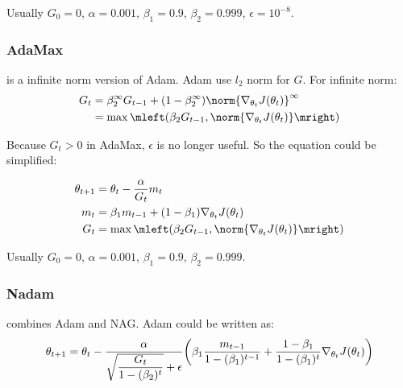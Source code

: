 Usually $G_0 = 0$, $\alpha = 0.001$, $\beta_1 = 0.9$, $\beta_2 = 0.999$, $\epsilon = 10^{-8}$.





\subsubsection{AdaMax}
\cite{Kingma2015} is a infinite norm version of Adam. Adam use $l_2$ norm for $G$. For infinite norm:
\begin{equation}
    \begin{aligned}
        G_t &= \beta_2^\infty G_{t-1} + (1-\beta_2^\infty ) \norm{\nabla_{\theta_t} J(\theta_t)}^\infty  \\
        &= \max \mleft(\beta_2 G_{t-1}, \norm{\nabla_{\theta_t} J(\theta_t)} \mright)
    \end{aligned}
\end{equation}

Because $G_t > 0$ in AdaMax, $\epsilon$ is no longer useful. So the equation could be simplified:

\begin{equation}
    \begin{aligned}
        \theta_{t+1} &= \theta_t - \frac{\alpha}{G_t}  m_t \\
        m_t &= \beta_1 m_{t-1} + (1-\beta_1) \nabla_{\theta_t} J(\theta_t) \\
        G_t &= \max \mleft(\beta_2 G_{t-1}, \norm{\nabla_{\theta_t} J(\theta_t)} \mright)
    \end{aligned}
\end{equation}

Usually $G_0 = 0$, $\alpha = 0.001$, $\beta_1 = 0.9$, $\beta_2 = 0.999$.


\subsubsection{Nadam}

\cite{Dozat2016} combines Adam and NAG. Adam could be written as:
\begin{equation}
    \theta_{t+1} = \theta_t - \frac{\alpha}{\sqrt{\displaystyle \frac{G_t}{1-(\beta_2)^t}} + \epsilon} \mleft(\beta_1 \frac{m_{t-1}}{1-(\beta_1)^{t-1}} + \frac{1-\beta_1}{1-(\beta_1)^t} \nabla_{\theta_t} J(\theta_t) \mright)
\end{equation}

